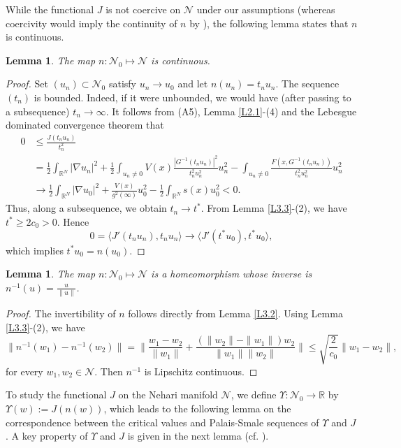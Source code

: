 \documentclass[10pt,a4paper]{amsart}
\numberwithin{equation}{section}
\newtheorem{lemma}[theorem]{Lemma}
\begin{document}
While the functional $J$ is not coercive on $\mathcal{N}$ under our assumptions 
(whereas coercivity would imply the continuity of $n$ by \cite[Lemma 2.8]{Szulkin1}), the following lemma states that $n$ is continuous.


\begin{lemma}\label{L3.8} 
The map $n:\mathcal{N}_0\mapsto \mathcal{N}$ is continuous.
\end{lemma}

\begin{proof}
Set $(u_n)\subset \mathcal{N}_0$  satisfy $u_n\to u_0$ and let $n(u_n)=t_nu_n$. 
The sequence $(t_n)$ is bounded. Indeed, if it were unbounded, we would have 
(after passing to a subsequence) $t_n \to \infty$. It follows from  (A5), 
Lemma \ref{L2.1}-(4) and the Lebesgue dominated convergence theorem that
\begin{align*}
0&\leq\frac{J(t_nu_n)}{t^2_n}\\
&= \frac{1}{2}\int_{\mathbb{R}^N}|\nabla u_n|^2+\frac{1}{2}\int_{u_n\neq 0}V(x)\frac{|G^{-1}(t_nu_n)|^2}{t^2_nu^2_n}u^2_n
-\int_{u_n\neq 0}\frac{F(x,G^{-1}(t_nu_n))}{t^2_nu^2_n}u^2_n \\
&\to  \frac{1}{2}\int_{\mathbb{R}^N}|\nabla u_0|^2+\frac{V(x)}{g^2(\infty)}u_0^2-\frac{1}{2}\int_{\mathbb{R}^N}s(x)u_0^2<0.
\end{align*}
Thus, along a subsequence, we obtain $t_n\to t^*$. From Lemma \ref{L3.3}-(2), we 
have $t^*\geq 2c_0>0$. Hence 
$$
0=\langle J'(t_nu_n),t_nu_n\rangle\to \langle J'(t^*u_0),t^*u_0\rangle,
$$  
which implies $t^*u_0=n(u_0)$.
\end{proof}

\begin{lemma}\label{L3.9} 
The map $n:\mathcal{N}_0\mapsto \mathcal{N}$ is a homeomorphism whose inverse  is  
$n^{-1}(u)=\frac{u}{\|u\|}$.
\end{lemma}

\begin{proof}
The invertibility of $n$  follows directly from Lemma \ref{L3.2}.
Using Lemma \ref{L3.3}-(2), we have 
$$
\|n^{-1}(w_1)-n^{-1}(w_2)\|=\|\frac{w_1-w_2}{\|w_1\|}+\frac{(\|w_2\|-\|w_1\|)w_2}{\|w_1\|\|w_2\|}\|\leq \sqrt{ \frac{2}{c_0}}\|w_1-w_2\|,
$$
for every $w_1, w_2\in\mathcal{N}$. Then $n^{-1}$ is Lipschitz continuous.
\end{proof}

To study the functional $J$ on the Nehari manifold $\mathcal{N}$, we define 
$\Upsilon: \mathcal{N}_0\to \mathbb{R}$ by $\Upsilon(w) := J(n(w))$, 
which leads to the following lemma on the correspondence between the critical values 
and Palais-Smale sequences of $\Upsilon$ and $J$. 
A key property of $\Upsilon$ and $J$ is given in the next lemma 
(cf. \cite[Lemma 3.9]{fang3}).
\end{document}
